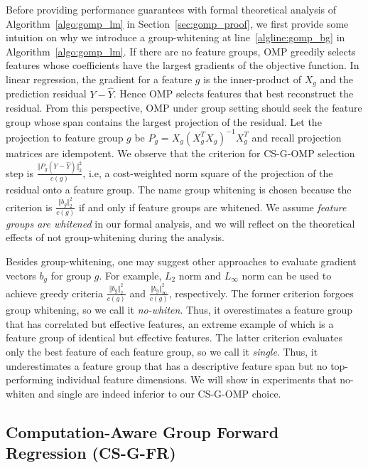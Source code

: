 Before providing performance guarantees with formal theoretical 
analysis of Algorithm~\ref{algo:gomp_lm} in Section~\ref{sec:gomp_proof}, we 
first provide some intuition on why we introduce a group-whitening at 
line~\ref{algline:gomp_bg} in Algorithm~\ref{algo:gomp_lm}.
If there are no feature groups, OMP greedily selects features whose
coefficients have the largest gradients of the objective function. 
In linear regression, the gradient for a feature $g$ 
is the inner-product of $X_g$ and the prediction 
residual $Y-\hat{Y}$. Hence OMP selects features that best reconstruct the 
residual. From this perspective, OMP under group setting 
should seek the feature group whose span contains the largest projection of the residual. 
Let the projection to feature group $g$ be 
$P_g = X_g(X_g^TX_g)^{-1}X_g^T$ and recall projection matrices are
idempotent. We observe that the criterion for CS-G-OMP selection step is
$\frac{\Vert P_g (Y - \hat{Y}) \Vert _2^2 }{c(g)}$, i.e, a cost-weighted
norm square of the projection of the residual onto a feature group. The 
name group whitening is chosen because the criterion is 
$\frac{\Vert b_g \Vert_2^2}{c(g)}$ if and only if feature groups are whitened. 
We assume \textit{feature groups are whitened} in our formal analysis, and we will
reflect on the theoretical effects of not group-whitening during the analysis.

Besides group-whitening, one may suggest other approaches 
to evaluate gradient vectors $b_g$ for group $g$. For example, 
$L_2$ norm and $L_{\infty}$ norm can be used to 
achieve greedy criteria $\frac{\Vert b_g \Vert_2^2}{c(g)}$ and 
$\frac{\Vert b_g \Vert ^2_{\infty}}{c(g)}$, respectively. 
The former criterion forgoes group whitening, so we call it \textit{no-whiten}.
Thus, it overestimates a feature group that has correlated 
but effective features, an extreme example of which is a
feature group of identical but effective features. The latter
criterion evaluates only the best feature of each feature group, so we call it \textit{single}. Thus, it
underestimates a feature group that has a descriptive 
feature span but no top-performing individual feature dimensions.
We will show in experiments that no-whiten and single
are indeed inferior to our CS-G-OMP choice. 


\subsection{Computation-Aware Group Forward Regression (CS-G-FR)}

